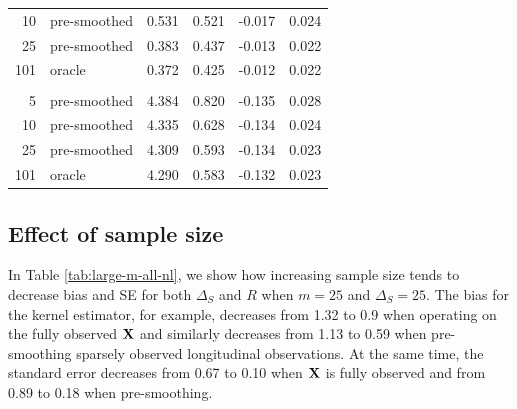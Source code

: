 \documentclass[useAMS,usenatbib,referee]{biom}
\begin{document}
\begin{table}[t]
\begin{tabular}{rlrrrr}
\hspace{1em}10 & pre-smoothed & 0.531 & 0.521 & -0.017 & 0.024\\
\hspace{1em}25 & pre-smoothed & 0.383 & 0.437 & -0.013 & 0.022\\
\hspace{1em}101 & oracle & 0.372 & 0.425 & -0.012 & 0.022\\
\addlinespace[0.3em]
\multicolumn{6}{l}{\textbf{Linear-unsmoothed}}\\
\hspace{1em}5 & pre-smoothed & 4.384 & 0.820 & -0.135 & 0.028\\
\hspace{1em}10 & pre-smoothed & 4.335 & 0.628 & -0.134 & 0.024\\
\hspace{1em}25 & pre-smoothed & 4.309 & 0.593 & -0.134 & 0.023\\
\hspace{1em}101 & oracle & 4.290 & 0.583 & -0.132 & 0.023\\
\bottomrule
\end{tabular}
\end{table}

\subsection{Effect of sample size} 
In Table \ref{tab:large-m-all-nl}, we show how increasing sample size tends to decrease bias and SE for both $\Delta_S$ and $R$ when $m = 25$ and $\Delta_S = 25$. The bias for the kernel estimator, for example, decreases from 1.32 to 0.9 when operating on the fully observed ${\bf X}$ and similarly decreases from 1.13 to 0.59 when pre-smoothing sparsely observed longitudinal observations. At the same time, the standard error decreases from 0.67 to 0.10 when ${\bf X}$ is fully observed and from 0.89 to 0.18 when pre-smoothing. 
\end{document}
